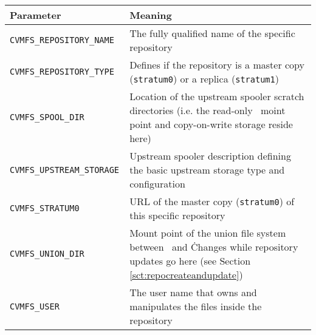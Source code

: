 	\begin{longtable}{lX}
		\toprule
		{\bf\centering Parameter} 			& {\bf\centering Meaning}\\
		\midrule
		\tt CVMFS\_REPOSITORY\_NAME			& The fully qualified name of the specific repository\\
		\tt CVMFS\_REPOSITORY\_TYPE			& Defines if the repository is a master copy (\texttt{stratum0}) or a replica (\texttt{stratum1})\\
		\tt CVMFS\_SPOOL\_DIR					& Location of the upstream spooler scratch directories (i.e. the read-only \cvmfs\ moint point and copy-on-write storage reside here)\\
		\tt CVMFS\_UPSTREAM\_STORAGE			& Upstream spooler description defining the basic upstream storage type and configuration\\
		\tt CVMFS\_STRATUM0					& URL of the master copy (\texttt{stratum0}) of this specific repository\\
		\tt CVMFS\_UNION\_DIR					& Mount point of the union file system between \cvmfs\ and \aufs\. Changes while repository updates go here (see Section \ref{sct:repocreateandupdate}) \\
		\tt CVMFS\_USER						& The user name that owns and manipulates the files inside the repository\\
		\bottomrule
	\end{longtable}
